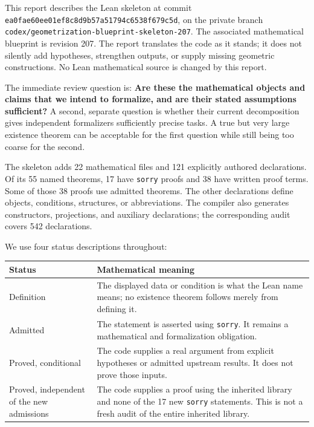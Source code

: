 \documentclass[
  letterpaper,
  11pt]{article}
\begin{document}
This report describes the Lean skeleton at commit
{\small\texttt{ea0fae6\allowbreak{}0ee01ef8\allowbreak{}c8d9b57a\allowbreak{}51794c65\allowbreak{}38f679c5\allowbreak{}d}},
on the private branch
{\small\texttt{codex/\allowbreak{}geometrization-\allowbreak{}blueprint-\allowbreak{}skeleton-\allowbreak{}207}}.
The associated mathematical blueprint is revision 207. The report
translates the code as it stands; it does not silently add hypotheses,
strengthen outputs, or supply missing geometric constructions. No Lean
mathematical source is changed by this report.

The immediate review question is: \textbf{Are these the mathematical
objects and claims that we intend to formalize, and are their stated
assumptions sufficient?} A second, separate question is whether their
current decomposition gives independent formalizers sufficiently precise
tasks. A true but very large existence theorem can be acceptable for the
first question while still being too coarse for the second.

The skeleton adds 22 mathematical files and 121 explicitly authored
declarations. Of its 55 named theorems, 17 have {\small\texttt{sorry}}
proofs and 38 have written proof terms. Some of those 38 proofs use
admitted theorems. The other declarations define objects, conditions,
structures, or abbreviations. The compiler also generates constructors,
projections, and auxiliary declarations; the corresponding audit covers
542 declarations.

We use four status descriptions throughout:

\begin{longtable}[]{@{}
  >{\raggedright\arraybackslash}p{}
  >{\raggedright\arraybackslash}p{}@{}}
\toprule\noalign{}
\begin{minipage}[b]{\linewidth}\raggedright
Status
\end{minipage} & \begin{minipage}[b]{\linewidth}\raggedright
Mathematical meaning
\end{minipage} \\
\midrule\noalign{}
\endhead
\bottomrule\noalign{}
\endlastfoot
Definition & The displayed data or condition is what the Lean name
means; no existence theorem follows merely from defining it. \\
Admitted & The statement is asserted using {\small\texttt{sorry}}. It
remains a mathematical and formalization obligation. \\
Proved, conditional & The code supplies a real argument from explicit
hypotheses or admitted upstream results. It does not prove those
inputs. \\
Proved, independent of the new admissions & The code supplies a proof
using the inherited library and none of the 17 new
{\small\texttt{sorry}} statements. This is not a fresh audit of the
entire inherited library. \\
\end{longtable}
\end{document}
